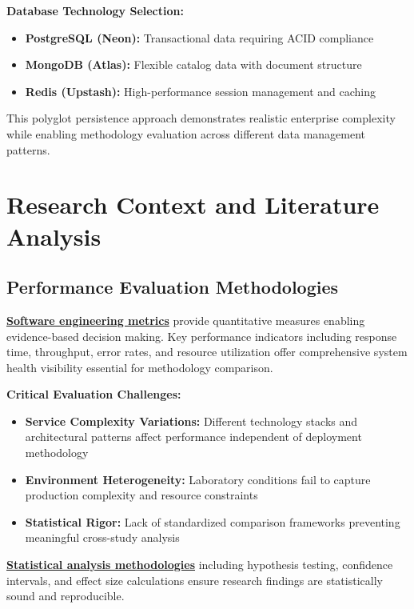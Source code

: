 \textbf{Database Technology Selection:}
\begin{itemize}
\item \textbf{PostgreSQL (Neon):} Transactional data requiring ACID compliance
\item \textbf{MongoDB (Atlas):} Flexible catalog data with document structure
\item \textbf{Redis (Upstash):} High-performance session management and caching
\end{itemize}

This polyglot persistence approach demonstrates realistic enterprise complexity while enabling methodology evaluation across different data management patterns.

\section{Research Context and Literature Analysis}

\subsection{Performance Evaluation Methodologies}

\textbf{\hyperref[fenton2014software]{Software engineering metrics}} provide quantitative measures enabling evidence-based decision making. Key performance indicators including response time, throughput, error rates, and resource utilization offer comprehensive system health visibility essential for methodology comparison.

\textbf{Critical Evaluation Challenges:}
\begin{itemize}
\item \textbf{Service Complexity Variations:} Different technology stacks and architectural patterns affect performance independent of deployment methodology
\item \textbf{Environment Heterogeneity:} Laboratory conditions fail to capture production complexity and resource constraints
\item \textbf{Statistical Rigor:} Lack of standardized comparison frameworks preventing meaningful cross-study analysis
\end{itemize}

\textbf{\hyperref[cohen1988statistical]{Statistical analysis methodologies}} including hypothesis testing, confidence intervals, and effect size calculations ensure research findings are statistically sound and reproducible.

